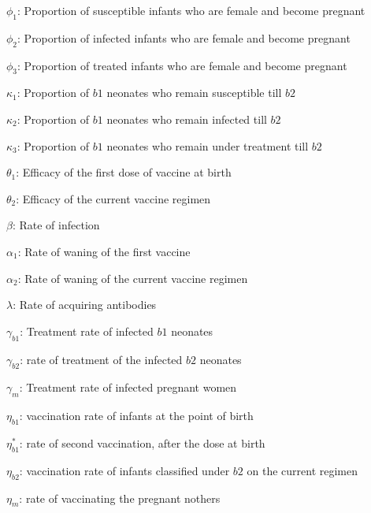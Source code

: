 \documentclass[11pt,a4paper]{article}
\begin{document}
	$\phi_1$: Proportion of susceptible infants who are female and become pregnant\vspace{1.5mm}
	
	$\phi_2$: Proportion of infected infants who are female and become pregnant\vspace{1.5mm}
	
	$\phi_3$: Proportion of treated infants who are female and become pregnant\vspace{1.5mm}
	
	$\kappa_1$: Proportion of $b1$ neonates who remain susceptible till $b2$ \vspace{1.5mm}
	
	$\kappa_2$: Proportion of $b1$ neonates who remain infected till $b2$ \vspace{1.5mm}
		
	$\kappa_3$: Proportion of $b1$ neonates who remain under treatment till $b2$ \vspace{1.5mm}
	
	$\theta_1$: Efficacy of the first dose  of vaccine at birth  \vspace{1.5mm}
	
	$\theta_2$: Efficacy of the current vaccine regimen \vspace{1.5mm}
	
	$\beta$: Rate of infection \vspace{1.5mm}
	
	$\alpha_1$: Rate of waning of the first vaccine \vspace{1.5mm}
	
	$\alpha_2$: Rate of waning of the current vaccine regimen \vspace{1.5mm}
	
	$\lambda$: Rate of acquiring antibodies \vspace{1.5mm}
	
	$\gamma_{b1}$: Treatment rate of infected $b1$ neonates \vspace{1.5mm}
	
	$\gamma_{b2}$: rate of treatment of the infected $b2$ neonates \vspace{1.5mm}
	
	$\gamma_{m}$: Treatment rate of infected pregnant women \vspace{1.5mm}
	
	$\eta_{b1}$: vaccination rate of infants at the point of birth \vspace{1.5mm}

	$\eta_{b1}^*$: rate of second vaccination, after the dose at birth \vspace{1.5mm}	
	
	$\eta_{b2}$: vaccination rate of infants classified under $b2$ on the current regimen\vspace{1.5mm}
		
	$\eta_{m}$: rate of vaccinating the pregnant nothers\vspace{1.5mm}
	
	
	
	
		
	
	
	
	
	

	
	
	
	
	
	
	
	
	
	
	
	
	\newpage
	
	
\end{document}
